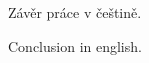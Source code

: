 \documentclass[12pt]{article}
\begin{document}
\begin{conclusions-cz}
  Závěr práce v češtině.
\end{conclusions-cz}


\begin{conclusions-en}
  Conclusion in english.
\end{conclusions-en}

\newpage



\end{document}
